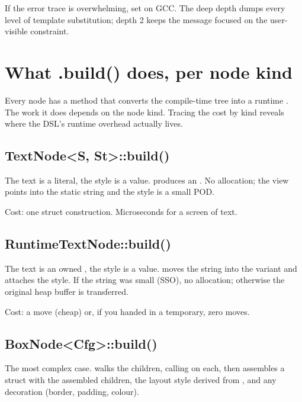 \begin{aside}
If the error trace is overwhelming, set 
on GCC. The deep depth dumps every level of template substitution;
depth 2 keeps the message focused on the user-visible constraint.
\end{aside}

\section{What .build() does, per node kind}

Every node has a  method that converts the
compile-time tree into a runtime . The work it does
depends on the node kind. Tracing the cost by kind reveals where
the DSL's runtime overhead actually lives.

\subsection*{TextNode<S, St>::build()}

The text is a literal, the style is a value.  produces
an .
No allocation; the view points into the static string and the
style is a small POD.

Cost: one struct construction. Microseconds for a screen of text.

\subsection*{RuntimeTextNode::build()}

The text is an owned , the style is a value.
 moves the string into the  variant and
attaches the style. If the string was small (SSO), no allocation;
otherwise the original heap buffer is transferred.

Cost: a move (cheap) or, if you handed in a temporary,
zero moves.

\subsection*{BoxNode<Cfg>::build()}

The most complex case.  walks the children, calling
 on each, then assembles a  struct with
the assembled children, the layout style derived from ,
and any decoration (border, padding, colour).

